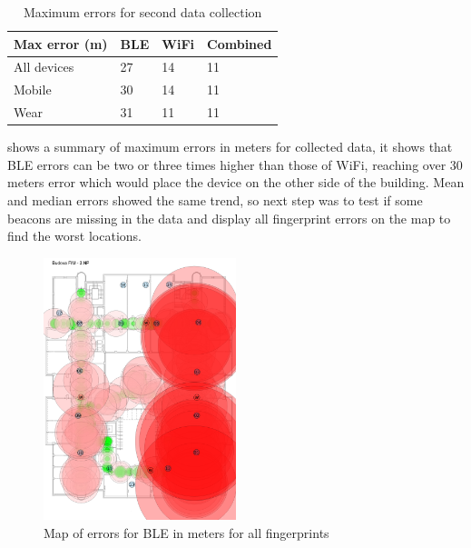 \vspace*{6pt}
\begin{table}[h]
	\begin{center}
		\begin{tabular}{ l C{2cm} C{2cm} C{2cm} }
			\hline
			Max error (m) & BLE & WiFi & Combined \\ 
			\hline
			All devices & 27 & 14 & 11 \\ 
			Mobile & 30 & 14 & 11 \\ 
			Wear & 31 & 11 & 11 \\ 
			\hline
		\end{tabular}
		\caption{Maximum errors for second data collection}
		\label{tab01c06}
	\end{center}
\end{table} 
\vspace*{-\baselineskip}
\vspace*{6pt}

 shows a summary of maximum errors in meters for collected data, it shows that BLE errors can be two or three times higher than those of WiFi, reaching over 30 meters error which would place the device on the other side of the building. Mean and median errors showed the same trend, so next step was to test if some beacons are missing in the data and display all fingerprint errors on the map to find the worst locations.

\begin{figure}[H]
	\begin{centering}
		\includegraphics[width=0.5\textwidth]{img/second_data_collection_errors}
		\par\end{centering}
	\caption{Map of errors for BLE in meters for all fingerprints}
	\label{fig02c06}
\end{figure}

